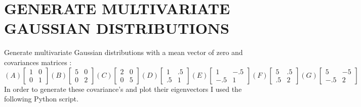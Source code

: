 \documentclass{article}
\begin{document}
\section{\MakeUppercase{Generate multivariate Gaussian distributions}}
\large{Generate multivariate Gaussian distributions with a mean vector of zero and covariances matrices :}
\[
(A)\begin{bmatrix} 
        1 & 0\\
        0 & 1
\end{bmatrix}
(B)\begin{bmatrix} 
        5 & 0\\
        0 & 2
\end{bmatrix}
(C)\begin{bmatrix} 
        2 & 0\\
        0 & 5
\end{bmatrix}
(D)\begin{bmatrix} 
        1 & .5\\
        .5 & 1
\end{bmatrix}
(E)\begin{bmatrix} 
        1 & -.5\\
        -.5 & 1
\end{bmatrix}
(F)\begin{bmatrix} 
        5 & .5\\
        .5 & 2
\end{bmatrix}
(G)\begin{bmatrix} 
        5 & -5\\
        -.5 & 2
\end{bmatrix}
\]
\break\break
In order to generate these covariance's and plot their eigenvectors I used the following Python script.
\end{document}
